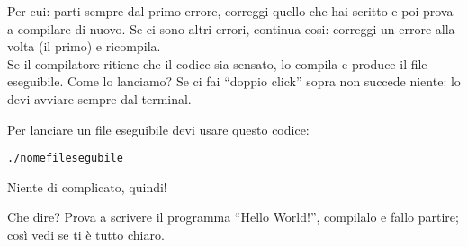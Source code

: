 	Per cui: parti sempre dal primo errore, correggi quello che hai scritto e poi prova a compilare di nuovo. Se ci sono altri errori, continua cosi: correggi un errore alla volta (il primo) e ricompila. \\
	
	Se il compilatore ritiene che il codice sia sensato, lo compila e produce il file eseguibile. Come lo lanciamo? Se ci fai ``doppio click'' sopra non succede niente: lo devi avviare sempre dal terminal. 
	
	Per lanciare un file eseguibile devi usare questo codice:
	\begin{shaded}
		\begin{minipage}{\textwidth}
			\begin{verbatim}
./nomefilesegubile
			\end{verbatim}%
		\end{minipage}
	\end{shaded}
	
	Niente di complicato, quindi! 
	
	Che dire? Prova a scrivere il programma ``Hello World!'', compilalo e fallo partire; così vedi se ti è tutto chiaro.
	
